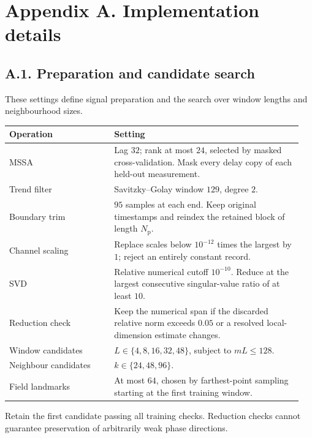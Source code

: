 \documentclass[11pt,a4paper]{article}
\begin{document}

\clearpage
\section*{Appendix A. Implementation details}
\label{app:numerics}
\begingroup\small
\setlength{\parskip}{3pt}
\setlength{\topsep}{3pt}
\setlength{\partopsep}{0pt}
\setlength{\abovedisplayskip}{4pt}
\setlength{\belowdisplayskip}{4pt}

\subsection*{A.1. Preparation and candidate search}
\label{app:preparation}
These settings define signal preparation and the search over window lengths
and neighbourhood sizes.
\begin{center}
\begin{tabular}{@{}p{0.34\linewidth}p{0.61\linewidth}@{}}
\toprule
Operation & Setting\\
\midrule
MSSA & Lag $32$; rank at most $24$, selected by masked cross-validation.
Mask every delay copy of each held-out measurement.\\
Trend filter & Savitzky--Golay window $129$, degree $2$.\\
Boundary trim & $95$ samples at each end. Keep original timestamps and
reindex the retained block of length $N_{\mathrm p}$.\\
Channel scaling & Replace scales below $10^{-12}$ times the largest by $1$;
reject an entirely constant record.\\
SVD & Relative numerical cutoff $10^{-10}$. Reduce at the largest
consecutive singular-value ratio of at least $10$.\\
Reduction check & Keep the numerical span if the discarded relative norm
exceeds $0.05$ or a resolved local-dimension estimate changes.\\
Window candidates & $L\in\{4,8,16,32,48\}$, subject to $mL\le128$.\\
Neighbour candidates & $k\in\{24,48,96\}$.\\
Field landmarks & At most $64$, chosen by farthest-point sampling
starting at the first training window.\\
\bottomrule
\end{tabular}
\end{center}
Retain the first candidate passing all training checks. Reduction checks
cannot guarantee preservation of arbitrarily weak phase directions.
\end{document}
